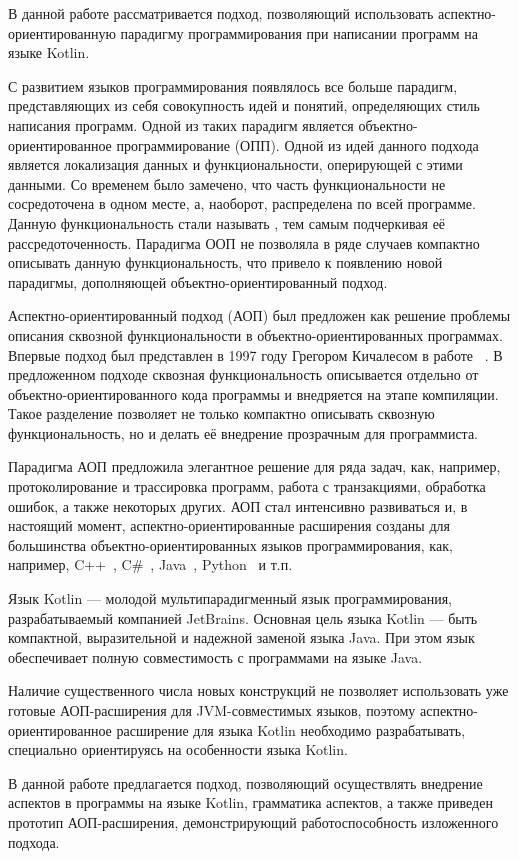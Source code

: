 \intro

В данной работе рассматривается подход, позволяющий использовать аспектно-ориентированную парадигму программирования при написании программ на языке Kotlin.

С развитием языков программирования появлялось все больше парадигм, представляющих из себя совокупность идей и понятий, определяющих стиль написания программ.
Одной из таких парадигм является объектно-ориентированное программирование (ОПП).
Одной из идей данного подхода является локализация данных и функциональности, оперирующей с этими данными.
Со временем было замечено, что часть функциональности не сосредоточена в одном месте, а, наоборот, распределена по всей программе.
Данную функциональность стали называть , тем самым подчеркивая её рассредоточенность.
Парадигма ООП не позволяла в ряде случаев компактно описывать данную функциональность, что привело к появлению новой парадигмы, дополняющей объектно-ориентированный подход.

Аспектно-ориентированный подход (АОП) был предложен как решение проблемы
описания сквозной функциональности в объектно-ориентированных программах.
Впервые подход был представлен в 1997 году Грегором Кичалесом в работе
~\cite{kiczales_aop}.
В предложенном подходе сквозная функциональность описывается отдельно от
объектно-ориентированного кода программы и внедряется на этапе компиляции.
Такое разделение позволяет не только компактно описывать сквозную 
функциональность, но и делать её внедрение прозрачным для программиста.

Парадигма АОП предложила элегантное решение для ряда задач, как, например, 
протоколирование и трассировка программ, работа с транзакциями, обработка
ошибок, а также некоторых других.
АОП стал интенсивно развиваться и, в настоящий момент, аспектно-ориентированные
расширения созданы для большинства объектно-ориентированных языков
программирования, как, например, C++~\cite{aspectC_homepage},
C\#~\cite{postsharp_doc}, Java~\cite{aspectj_doc,springAOP_doc},
Python~\cite{spring_python} и т.п.

Язык Kotlin --- молодой мультипарадигменный язык программирования,
разрабатываемый компанией JetBrains.
Основная цель языка Kotlin --- быть компактной, выразительной и надежной заменой
языка Java.
При этом язык обеспечивает полную совместимость с программами на языке
Java.

Наличие существенного числа новых конструкций не позволяет использовать уже 
готовые АОП-расширения для JVM-совместимых языков, поэтому
аспектно-ориентированное  расширение для языка Kotlin необходимо разрабатывать,
специально ориентируясь на особенности языка Kotlin.

В данной работе предлагается подход, позволяющий осуществлять внедрение аспектов в программы на языке Kotlin, грамматика аспектов, а также приведен прототип АОП-расширения, демонстрирующий работоспособность изложенного подхода.